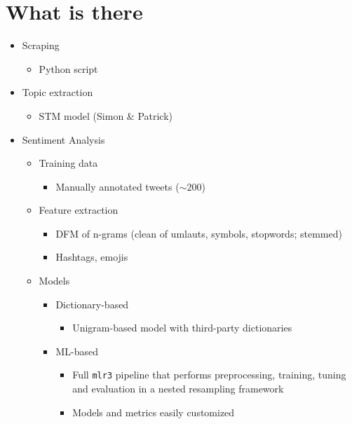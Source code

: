 \documentclass[12pt]{article}
\begin{document}


\section*{What is there}

\begin{itemize}
  \item Scraping
  \begin{itemize}
    \item Python script
  \end{itemize}
  \item Topic extraction
  \begin{itemize}
    \item STM model (Simon \& Patrick)
  \end{itemize}
  \item Sentiment Analysis
  \begin{itemize}
    \item Training data
    \begin{itemize}
      \item Manually annotated tweets ($\sim 200$)
    \end{itemize}
    \item Feature extraction
    \begin{itemize}
      \item DFM of n-grams (clean of umlauts, symbols, stopwords; stemmed)
      \item Hashtags, emojis
    \end{itemize}
    \item Models
    \begin{itemize}
      \item Dictionary-based
      \begin{itemize}
        \item Unigram-based model with third-party dictionaries
      \end{itemize}
      \item ML-based
      \begin{itemize}
        \item Full \texttt{mlr3} pipeline that performs preprocessing, training,
        tuning and evaluation in a nested resampling framework
        \item Models and metrics easily customized
      \end{itemize}
    \end{itemize}
  \end{itemize}
  
\end{itemize}
\end{document}
